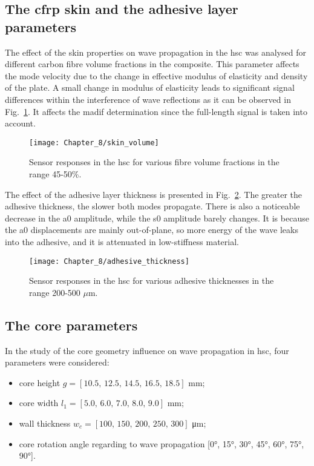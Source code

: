 \subsection{The \ac{cfrp} skin and the adhesive layer parameters}

The effect of the skin properties on wave propagation in the \ac{hsc} was analysed for different carbon fibre volume fractions in the composite.
This parameter affects the mode velocity due to the change in effective modulus of elasticity and density of the plate.
A small change in modulus of elasticity leads to significant signal differences within the interference of wave reflections as it can be observed in Fig.~\ref{fig:skin_volume}.
It affects the \ac{madif} determination since the full-length signal is taken into account.

\begin{figure}
	\begin{center}
		\texttt{[image: Chapter\_8/skin\_volume]}
	\end{center}
		\caption{Sensor responses in the \acf{hsc} for various fibre volume fractions in the range 45-50\%.}
	\label{fig:skin_volume}
\end{figure}

The effect of the adhesive layer thickness is presented in Fig.~\ref{fig:adhesive_thickness}.
The greater the adhesive thickness, the slower both modes propagate.
There is also a noticeable decrease in the \ac{a0} amplitude, while the \ac{s0} amplitude barely changes.
It is because the \ac{a0} displacements are mainly out-of-plane, so more energy of the wave leaks into the adhesive, and it is attenuated in low-stiffness material.

\begin{figure}
	\begin{center}
		\texttt{[image: Chapter\_8/adhesive\_thickness]}
	\end{center}
	\caption{Sensor responses in the \acf{hsc} for various adhesive thicknesses in the range 200-500 \(\mu\)m.}
	\label{fig:adhesive_thickness}
\end{figure}

\subsection{The core parameters}
In the study of the core geometry influence on wave propagation in \ac{hsc}, four parameters were considered:
\begin{itemize}
	\item core height \(g=[10.5,\,12.5,\,14.5,\,16.5,\,18.5]\) \unit{\mm};
	\item core width \(l_1=[5.0,\,6.0,\,7.0,\,8.0,\,9.0]\) \unit{\mm};
	\item wall thickness \(w_c=[100,\,150,\,200,\,250,\,300]\) \unit{\micro\m};
	\item core rotation angle regarding to wave propagation [\ang{0}, \ang{15}, \ang{30}, \ang{45}, \ang{60}, \ang{75}, \ang{90}].
\end{itemize}

